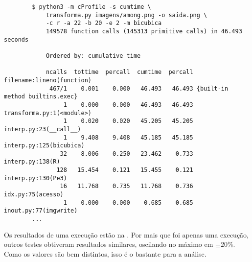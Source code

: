     \begin{verbatim}
        $ python3 -m cProfile -s cumtime \
            transforma.py imagens/among.png -o saida.png \
            -c r -a 22 -b 20 -e 2 -m bicubica
            149578 function calls (145313 primitive calls) in 46.493 seconds

            Ordered by: cumulative time

            ncalls  tottime  percall  cumtime  percall filename:lineno(function)
             467/1    0.001    0.000   46.493   46.493 {built-in method builtins.exec}
                 1    0.000    0.000   46.493   46.493 transforma.py:1(<module>)
                 1    0.020    0.020   45.205   45.205 interp.py:23(__call__)
                 1    9.408    9.408   45.185   45.185 interp.py:125(bicubica)
                32    8.006    0.250   23.462    0.733 interp.py:138(R)
               128   15.454    0.121   15.455    0.121 interp.py:130(Pe3)
                16   11.768    0.735   11.768    0.736 idx.py:75(acesso)
                 1    0.000    0.000    0.685    0.685 inout.py:77(imgwrite)
        ...
    \end{verbatim}

    Os resultados de uma execução estão na . Por mais que foi apenas uma execução, outros testes obtiveram resultados similares, oscilando no máximo em $\pm 20\%$. Como os valores são bem distintos, isso é o bastante para a análise.
